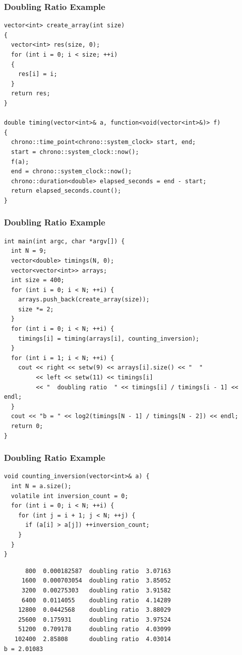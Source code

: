\documentclass{beamer}
\begin{document}
\begin{frame}[containsverbatim]
\frametitle{Doubling Ratio Example}
\scriptsize
\begin{lstlisting}
vector<int> create_array(int size)
{
  vector<int> res(size, 0);
  for (int i = 0; i < size; ++i)
  {
    res[i] = i;
  }
  return res;
}

double timing(vector<int>& a, function<void(vector<int>&)> f)
{
  chrono::time_point<chrono::system_clock> start, end;
  start = chrono::system_clock::now();
  f(a);
  end = chrono::system_clock::now();
  chrono::duration<double> elapsed_seconds = end - start;
  return elapsed_seconds.count();
}
\end{lstlisting}

\end{frame}

\begin{frame}[containsverbatim]
\frametitle{Doubling Ratio Example}
\scriptsize
\begin{lstlisting}
int main(int argc, char *argv[]) {
  int N = 9;
  vector<double> timings(N, 0);
  vector<vector<int>> arrays;
  int size = 400;
  for (int i = 0; i < N; ++i) {
    arrays.push_back(create_array(size));
    size *= 2;
  }
  for (int i = 0; i < N; ++i) {
    timings[i] = timing(arrays[i], counting_inversion);
  }
  for (int i = 1; i < N; ++i) {
    cout << right << setw(9) << arrays[i].size() << "  "
         << left << setw(11) << timings[i]
         << "  doubling ratio  " << timings[i] / timings[i - 1] << endl;
  }
  cout << "b = " << log2(timings[N - 1] / timings[N - 2]) << endl;
  return 0;
}
\end{lstlisting}

\end{frame}

\begin{frame}[containsverbatim]
\frametitle{Doubling Ratio Example}
\scriptsize
\begin{lstlisting}
void counting_inversion(vector<int>& a) {
  int N = a.size();
  volatile int inversion_count = 0;
  for (int i = 0; i < N; ++i) {
    for (int j = i + 1; j < N; ++j) {
      if (a[i] > a[j]) ++inversion_count;
    }
  }
}
\end{lstlisting}

\begin{verbatim}
      800  0.000182587  doubling ratio  3.07163
     1600  0.000703054  doubling ratio  3.85052
     3200  0.00275303   doubling ratio  3.91582
     6400  0.0114055    doubling ratio  4.14289
    12800  0.0442568    doubling ratio  3.88029
    25600  0.175931     doubling ratio  3.97524
    51200  0.709178     doubling ratio  4.03099
   102400  2.85808      doubling ratio  4.03014
b = 2.01083
\end{verbatim}

\end{frame}
\end{document}
